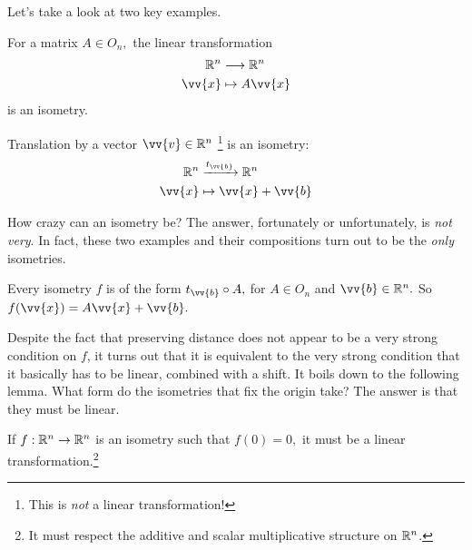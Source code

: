 Let's take a look at two key examples.

\begin{example}
For a matrix $A \in O_n,$ the linear transformation 
\begin{align*}
\RR^n &\rto \RR^n \\
\vv{x} &\mapsto A\vv{x}
\end{align*}
is an isometry.
\end{example}


\begin{example}
Translation by a vector $\vv{v} \in \RR^n$ \footnote{This is \emph{not} a linear transformation!} is an isometry:
\begin{align*}
    \RR^n &\xrightarrow[]{t_{\vv{b}}} \RR^n \\
    \vv{x} &\mapsto \vv{x} + \vv{b}
\end{align*}
\end{example}

How crazy can an isometry be? The answer, fortunately or unfortunately, is \emph{not very}. In fact, these two examples and their compositions turn out to be the \emph{only} isometries. 

\begin{theorem}\label{isometry linear trans}
Every isometry $f$ is of the form $t_{\vv{b}}\circ A,$ for $A \in O_n$ and $\vv{b} \in \RR^n.$ So $f(\vv{x}) = A\vv{x} + \vv{b}.$
\end{theorem}

Despite the fact that preserving distance does not appear to be a very strong condition on $f$, it turns out that it is equivalent to the very strong condition that it basically has to be linear, combined with a shift. It boils down to the following lemma. What form do the isometries that fix the origin take? The answer is that they must be linear.

\begin{lemma}
If $f: \mathbb R^n \rightarrow \mathbb R^n$ is an isometry such that $f(0) = 0,$ it must be a linear transformation.\footnote{It must respect the additive and scalar multiplicative structure on $\mathbb R^n$.} 
\end{lemma}

